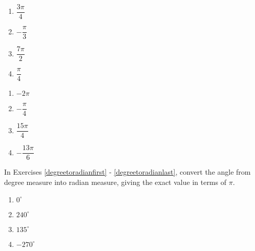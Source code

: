 \documentclass[10pt]{article}
\begin{document}
\begin{multicols}{4} 

\begin{enumerate}

\setcounter{enumi}{\value{HW}}

\item $\dfrac{3\pi}{4}$
\item $-\dfrac{\pi}{3}$ 
\item $\dfrac{7\pi}{2}$
\item $\dfrac{\pi}{4}$ 

\setcounter{HW}{\value{enumi}}

\end{enumerate}

\end{multicols}


\begin{multicols}{4} 

\begin{enumerate}

\setcounter{enumi}{\value{HW}}

\item  $-2\pi$ 
\item $-\dfrac{\pi}{4}$ 
\item $\dfrac{15\pi}{4}$
\item $-\dfrac{13\pi}{6}$ \label{orientedanglelast}

\setcounter{HW}{\value{enumi}}

\end{enumerate}

\end{multicols}

In Exercises \ref{degreetoradianfirst} - \ref{degreetoradianlast}, convert the angle from degree measure into radian measure, giving the exact value in terms of $\pi$.

\begin{multicols}{4} 

\begin{enumerate}

\setcounter{enumi}{\value{HW}}

\item $0^{\circ}$ \label{degreetoradianfirst}
\item $240^{\circ}$
\item $135^{\circ}$
\item $-270^{\circ}$

\setcounter{HW}{\value{enumi}}

\end{enumerate}

\end{multicols}
\end{document}
